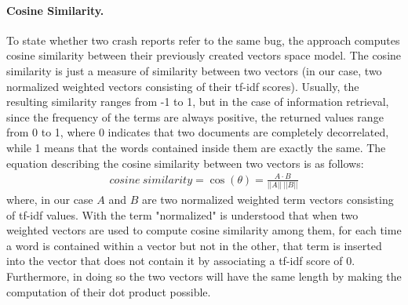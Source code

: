 \paragraph{Cosine Similarity.}
\label{sec:cosine_similarity}
To state whether two crash reports refer to the same bug, the approach computes cosine similarity between their previously created vectors space model. 
The cosine similarity is just a measure of similarity between two vectors \cite{cosine} (in our case, two normalized weighted vectors consisting of their tf-idf scores).
Usually, the resulting similarity ranges from -1 to 1, but in the case of information retrieval, since the frequency of the terms are always positive, the returned values range from 0 to 1, where 0 indicates that two documents are completely decorrelated, while 1 means that the words contained inside them are exactly the same.  
The equation describing the cosine similarity between two vectors is as follows: 
\begin{align*}
cosine\:similarity = \cos({\theta}) = \frac{A\cdot{B}}{||A||\:||B||}
\end{align*}
where, in our case $A$ and $B$ are two normalized weighted term vectors consisting of tf-idf values. 
With the term "normalized" is understood that when two weighted vectors are used to compute cosine similarity among them, for each time a word is contained within a vector but not in the other, that term is inserted into the vector that does not contain it by associating a tf-idf score of 0. Furthermore, in doing so the two vectors will have the same length by making the computation of their dot product possible. 



